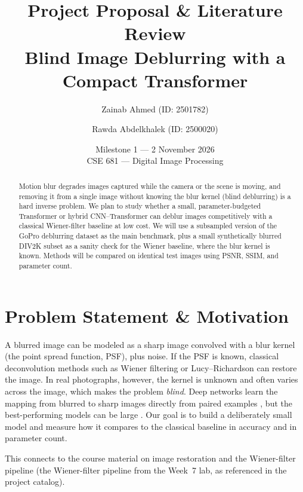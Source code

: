 \documentclass[11pt]{article}
\title{\LARGE Project Proposal \& Literature Review \\[4pt]
\large Blind Image Deblurring with a Compact Transformer}
\author{
  Zainab Ahmed (ID: 2501782) \and
  Rawda Abdelkhalek (ID: 2500020)
}
\date{Milestone 1 --- 2 November 2026 \\{} CSE 681 --- Digital Image Processing}
\begin{document}
\maketitle

\begin{abstract}
Motion blur degrades images captured while the camera or the scene is moving, and
removing it from a single image without knowing the blur kernel (blind deblurring) is
a hard inverse problem. We plan to study whether a small, parameter-budgeted
Transformer or hybrid CNN--Transformer can deblur images competitively with a classical
Wiener-filter baseline at low cost. We will use a subsampled version of the GoPro
deblurring dataset as the main benchmark, plus a small synthetically blurred DIV2K
subset as a sanity check for the Wiener baseline, where the blur kernel is known.
Methods will be compared on identical test images using PSNR, SSIM, and parameter count.
\end{abstract}

\section{Problem Statement \& Motivation}
\label{sec:motivation}
A blurred image can be modeled as a sharp image convolved with a blur kernel (the point
spread function, PSF), plus noise. If the PSF is known, classical deconvolution
methods such as Wiener filtering or Lucy--Richardson \citep{richardson1972,lucy1974}
can restore the image. In real photographs, however, the kernel is unknown and often
varies across the image, which makes the problem \emph{blind}. Deep networks learn the
mapping from blurred to sharp images directly from paired examples
\citep{nah2017,kupyn2019}, but the best-performing models can be large
\citep{kong2023,mao2024}. Our goal is to build a deliberately small model and measure
how it compares to the classical baseline in accuracy and in parameter count.

This connects to the course material on image restoration and the Wiener-filter
pipeline (the Wiener-filter pipeline from the Week~7 lab, as referenced in the project catalog).
\end{document}
